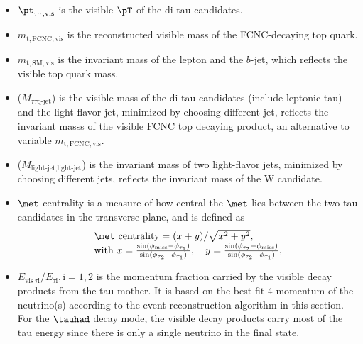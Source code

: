 \begin{itemize}
\item ${\pt}_{\tau\tau,\text{vis}}$ is the visible $\pT$ of the di-tau candidates.
\item $m_{\text{t},\text{FCNC},\text{vis}}$ is the reconstructed visible mass of the FCNC-decaying top quark.
\item $m_{\text{t},\text{SM},\text{vis}}$ is the invariant mass of the lepton and the $b$-jet, which reflects the visible top quark mass.
\item {}($M_{\tau\tau \text{q-jet}}$) is the visible mass of the di-tau candidates (include leptonic tau) and the light-flavor jet, minimized by choosing different jet, reflects the invariant masss of the visible FCNC top decaying product, an alternative to variable $m_{\text{t},\text{FCNC},\text{vis}}$.
\item {}($M_{\text{light-jet},\text{light-jet}}$) is the invariant mass of two light-flavor jets, minimized by choosing different jets, reflects the invariant mass of the W candidate.
\item $\met$ centrality is a measure of how central the $\met$ lies between the two tau candidates in the transverse plane, and is defined as
\begin{eqnarray}
\begin{array}{l}
\met~\text{centrality} = {(x+y)}/{\sqrt{x^2+y^2}}, \\
\text{with}~x=\frac{\sin(\phi_{\text{miss}}-\phi_{\tau_1})}{\sin(\phi_{\tau_2}-\phi_{\tau_1})}, \quad  y=\frac{\sin(\phi_{\tau_2}-\phi_{\text{miss}})}{\sin(\phi_{\tau_2}-\phi_{\tau_1})} ,
\end{array}
\label{eq:eq3}
\end{eqnarray}
\item $E_{\text{vis}~\tau\text{i}}/E_{\tau\text{i}},\text{i}=1,2$ is the momentum fraction carried by the visible decay products from the tau mother. It is based on the best-fit 4-momentum of the neutrino(s) according to the event reconstruction algorithm in this section. For the $\tauhad$ decay mode, the visible decay products carry most of the tau energy since there is only a single neutrino in the final state.%

\end{itemize}
